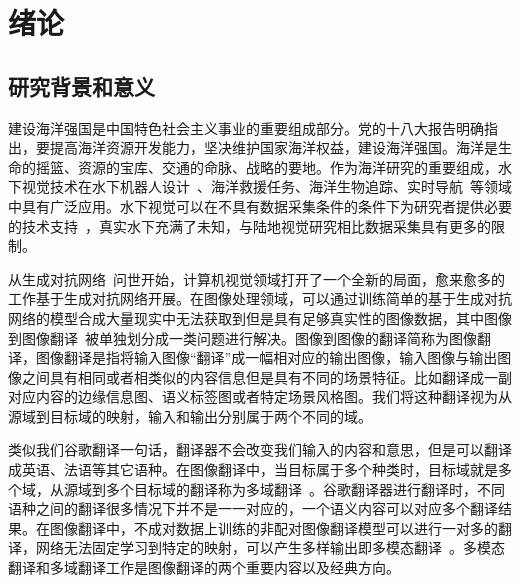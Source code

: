 \chapter{绪论}
\section{研究背景和意义}

建设海洋强国是中国特色社会主义事业的重要组成部分。党的十八大报告明确指出，要提高海洋资源开发能力，坚决维护国家海洋权益，建设海洋强国。海洋是生命的摇篮、资源的宝库、交通的命脉、战略的要地。作为海洋研究的重要组成，水下视觉技术在水下机器人设计~\cite{kim2012object,li2020object}、海洋救援任务、海洋生物追踪、实时导航~\cite{chen2012real}等领域中具有广泛应用。水下视觉可以在不具有数据采集条件的条件下为研究者提供必要的技术支持~\cite{ludvigsen2007applications,万媛媛2012水下光视觉目标检测与定位系统关键技术研究}，真实水下充满了未知，与陆地视觉研究相比数据采集具有更多的限制。

从生成对抗网络~\cite{goodfellow2014generative}问世开始，计算机视觉领域打开了一个全新的局面，愈来愈多的工作基于生成对抗网络开展。在图像处理领域，可以通过训练简单的基于生成对抗网络的模型合成大量现实中无法获取到但是具有足够真实性的图像数据，其中图像到图像翻译~\cite{isola2017image}被单独划分成一类问题进行解决。图像到图像的翻译简称为图像翻译，图像翻译是指将输入图像“翻译”成一幅相对应的输出图像，输入图像与输出图像之间具有相同或者相类似的内容信息但是具有不同的场景特征。比如翻译成一副对应内容的边缘信息图、语义标签图或者特定场景风格图。我们将这种翻译视为从源域到目标域的映射，输入和输出分别属于两个不同的域。


类似我们谷歌翻译一句话，翻译器不会改变我们输入的内容和意思，但是可以翻译成英语、法语等其它语种。在图像翻译中，当目标属于多个种类时，目标域就是多个域，从源域到多个目标域的翻译称为多域翻译~\cite{choi2018stargan,choi2020stargan,lee2020drit++}。谷歌翻译器进行翻译时，不同语种之间的翻译很多情况下并不是一一对应的，一个语义内容可以对应多个翻译结果。在图像翻译中，不成对数据上训练的非配对图像翻译模型可以进行一对多的翻译，网络无法固定学习到特定的映射，可以产生多样输出即多模态翻译~\cite{huang2018multimodal,lee2018diverse,lee2020drit++}。多模态翻译和多域翻译工作是图像翻译的两个重要内容以及经典方向。

